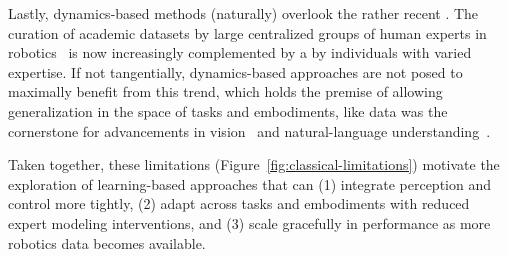 Lastly, dynamics-based methods (naturally) overlook the rather recent . 
The curation of academic datasets by large centralized groups of human experts in robotics~\citep{oneillOpenXEmbodimentRobotic2025, khazatskyDROIDLargeScaleInTheWild2025} is now increasingly complemented by a  by individuals with varied expertise.
If not tangentially, dynamics-based approaches are not posed to maximally benefit from this trend, which holds the premise of allowing generalization in the space of tasks and embodiments, like data was the cornerstone for advancements in vision~\citep{alayracFlamingoVisualLanguage2022} and natural-language understanding~\citep{brownLanguageModelsAre2020}.

Taken together, these limitations (Figure~\ref{fig:classical-limitations}) motivate the exploration of learning-based approaches that can (1) integrate perception and control more tightly, (2) adapt across tasks and embodiments with reduced expert modeling interventions, and (3) scale gracefully in performance as more robotics data becomes available.